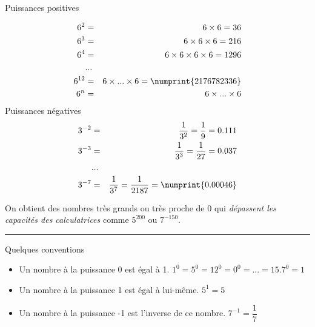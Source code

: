 \documentclass[10pt]{article}
\newcommand{\horrule}[1]{\rule{\linewidth}{#1}} %
\begin{document}
\begin{multicols}{2}
  
  \begin{Definition}{Puissances positives}
    
    \vspace{-4ex}

    \begin{eqnarray*}
      6^2 &=& 6 \times 6 = 36\\
      6^3 &=& 6 \times 6 \times 6 = 216\\
      6^4 &=& 6 \times 6 \times 6 \times 6 = 1296\\
      &...& \\
      6^{12} &=& 6 \times ... \times 6 = \numprint{2 176 782 336} \\
      6^n &=& 6 \times ... \times 6
    \end{eqnarray*}
    Puissances négatives
    \begin{eqnarray*}
      3^{-2} &=& \dfrac{1}{3^{2}}  = \dfrac{1}{9} = 0.111\\
      3^{-3} &=& \dfrac{1}{3^{3}} = \dfrac{1}{27} = 0.037\\
      &...& \\
      3^{-7} &=& \dfrac{1}{3^{7}} = \dfrac{1}{2187} = \numprint{0.00046}
    \end{eqnarray*}
    
  \end{Definition}
\end{multicols}

On obtient des nombres très grands ou très proche de 0 qui \textit{dépassent les capacités des calculatrices} comme $5^{200}$ ou $7^{-150}$.

\horrule{0.5px}

\begin{multicols}{2}

  \begin{Definition}{Quelques conventions}
    \begin{itemize}
    \item  Un nombre à la puissance 0 est égal à 1. \newline
      $1^0 = 5^0 = 12^0 = 0^0 = ... = 15.7^0 = 1$ \\
    \item Un nombre à la puissance 1 est égal à lui-même. \newline
      $5^1 = 5$
    \item Un nombre à la puissance -1 est l'inverse de ce nombre. \newline
      $7^{-1} = \dfrac{1}{7}$
    \end{itemize}
  \end{Definition}

\end{multicols}
\end{document}
